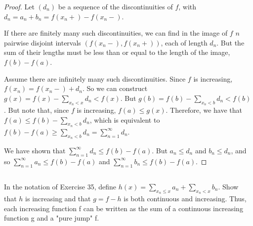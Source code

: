 \begin{proof}
Let $(d_n)$ be a sequence of the discontinuities of $f$, with $d_n = a_n + b_n = f(x_n+) - f(x_n-)$.

If there are finitely many such discontinuities, we can find in the image of $f$ $n$ pairwise disjoint intervals $(f(x_n-),f(x_n+))$, each of length $d_n$. But the sum of their lengths must be less than or equal to the length of the image, $f(b) - f(a)$.

Assume there are infinitely many such discontinuities. Since $f$ is increasing, $f(x_n) = f(x_n-) + d_n$. So we can construct $g(x) = f(x) - \sum_{x_n < x} d_n < f(x)$. But $g(b) = f(b) - \sum_{x_n < b} d_n < f(b)$. But note that, since $f$ is increasing, $f(a) \leq g(x)$. Therefore, we have that $f(a) \leq f(b) - \sum_{x_n < b} d_n$, which is equivalent to $f(b) - f(a) \geq \sum_{x_n < b} d_n = \sum_{n=1}^\infty d_n$.

We have shown that $\sum_{n=1}^\infty d_n \leq f(b) - f(a)$. But $a_n \leq d_n$ and $b_n \leq d_n$, and so $\sum_{n=1}^\infty a_n \leq f(b)-f(a)$ and $\sum_{n=1}^\infty b_n \leq f(b)-f(a)$. 


\end{proof}

\subsection{} In the notation of Exercise 35, define $h(x) = \sum_{x_n \leq x} a_n + \sum_{x_n<x} b_n$. Show that $h$ is increasing and that $g = f - h$  is both continuous and increasing. Thus, each increasing function f can be written as the sum of a continuous increasing function g and a "pure jump" f.

